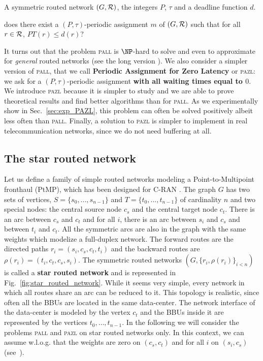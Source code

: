 \documentclass[a4paper,10pt]{IEEEtran}
\newcommand\pazl{\textsc{pazl}\xspace}
\newcommand\pall{\textsc{pall}\xspace}
\begin{document}
      \noindent {\bf Periodic Assignment for Low Latency (\pall)} 

 
        A symmetric routed network $(G,{\cal R})$, the integers $P$, $\tau$ and a deadline function $d$.
      
       does there exist a $(P,\tau)$-periodic assignment $m$ of $(G,{\cal R})$ such that for all $r \in {\cal R}$, $PT(r) \leq d(r)$?



      It turns out that the problem \pall is $\NP$-hard to solve and even to approximate for \emph{general} routed networks (see the long version \cite{versionlongue}).      
        We also consider a simpler version of \pall, that we call {\bf Periodic Assignment for Zero Latency} or \pazl: we ask for a $(P,\tau)$-periodic assignment {\bf with all waiting times equal to $0$}. We introduce \pazl because it is simpler to study and we are able to prove theoretical results and find better algorithms than for \pall. As we  experimentally show in Sec.~\ref{sec:exp_PAZL}, this problem can often be solved positively albeit less often than \pall. Finally, a solution to \pazl is simpler to implement in real telecommunication networks, since we do not need buffering at all. 
       
    
    \subsection{The star routed network}
    
     Let us define a family of simple routed networks modeling a Point-to-Multipoint fronthaul (PtMP), which has been designed for C-RAN \cite{tayq2017real}. 
      The graph $G$ has two sets of vertices, $S=\{s_0,...,s_{n-1}\}$ and $T=\{t_0,...,t_{n-1}\}$ of cardinality $n$ and two special nodes:
      the central source node {\bf $c_s$} and the central target node {\bf $c_t$}.
      There is an arc between {\bf $c_s$} and {\bf $c_t$} and for all $i$, there is an arc between $s_i$ and $c_s$ and between $t_i$ and $c_t$.
      All the symmetric arcs are also in the graph with the same weights which modelize a full-duplex network.
      The forward routes are the directed paths $r_i = (s_i,c_s,c_t,t_i)$ and the backward routes are $\rho(r_i) = (t_i,c_t,c_s,s_i)$. 
      The symmetric routed networks $(G, \{r_i,\rho(r_i)\}_{i<n})$ is called a \textbf{star routed network} and is represented in Fig.~\ref{fig:star_routed_network}. While it seems very simple, every network in which all routes share an arc can be reduced to it. This topology is realistic, since often all the BBUs are located in the same data-center. The network interface of the data-center is modeled by the vertex $c_t$ and the BBUs inside it are represented by the vertices $t_0,\dots,t_{n-1}$. In the following we will consider the problems \pall and \pazl on star routed networks only. 
      In this context, we can assume w.l.o.g. that the weights are zero on $(c_s,c_t)$ and for all $i$ on $(s_i,c_s)$ (see~\cite{versionlongue}).
\end{document}

